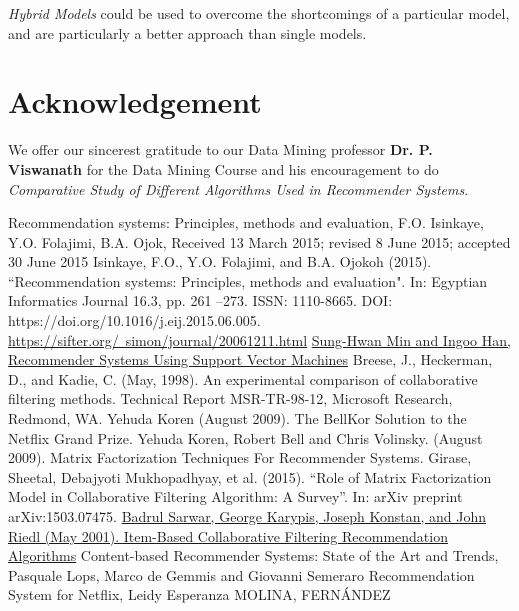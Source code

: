 \documentclass[conference]{IEEEtran}
\begin{document}
\textit{Hybrid Models} could be  used to overcome the shortcomings of a particular model, and are particularly a better approach than single models.

\section*{Acknowledgement}
We offer our sincerest gratitude to our Data Mining professor \textbf{Dr. P. Viswanath} for the Data Mining Course and his encouragement to do \textit{Comparative Study of Different Algorithms Used in Recommender Systems}.

\begin{thebibliography}{00}
 Recommendation systems: Principles, methods and
evaluation, F.O. Isinkaye, Y.O. Folajimi, B.A. Ojok, Received 13 March 2015; revised 8 June 2015; accepted 30 June 2015
 Isinkaye, F.O., Y.O. Folajimi, and B.A. Ojokoh (2015). ``Recommendation systems: Principles, methods and evaluation". In: Egyptian Informatics Journal 16.3, pp. 261 –273. ISSN: 1110-8665. DOI: https://doi.org/10.1016/j.eij.2015.06.005. 
 \href{https://sifter.org/~simon/journal/20061211.html}{https://sifter.org/~simon/journal/20061211.html}
 \href{https://link.springer.com/content/pdf/10.1007\%2F11531371_50.pdf}{Sung-Hwan Min and Ingoo Han, Recommender Systems Using Support Vector Machines} 
 Breese, J., Heckerman, D., and Kadie, C. (May, 1998). An experimental comparison of collaborative filtering methods. Technical
Report MSR-TR-98-12, Microsoft Research, Redmond, WA.
 Yehuda Koren (August 2009). The BellKor Solution to the Netflix Grand Prize.
 Yehuda Koren, Robert Bell and Chris Volinsky. (August 2009). Matrix Factorization  Techniques For Recommender Systems.
Girase, Sheetal, Debajyoti Mukhopadhyay, et al. (2015). “Role of Matrix Factorization Model in Collaborative Filtering Algorithm: A Survey”. In: arXiv preprint arXiv:1503.07475. 
\href{http://files.grouplens.org/papers/www10_sarwar.pdf}{Badrul Sarwar, George Karypis, Joseph Konstan, and John Riedl (May 2001). Item-Based Collaborative Filtering Recommendation Algorithms}
Content-based Recommender Systems: State of the Art and Trends, Pasquale Lops, Marco de Gemmis and Giovanni Semeraro
Recommendation System for Netflix, Leidy Esperanza MOLINA, FERNÁNDEZ
\end{thebibliography}
\end{document}

